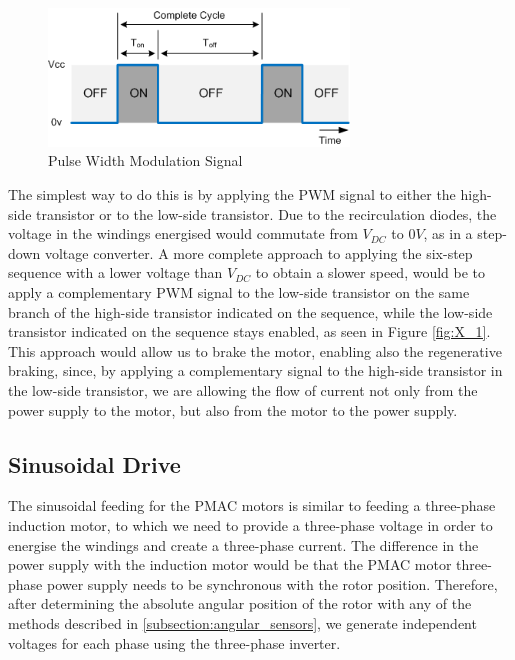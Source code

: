 \begin{figure}[htbp]
\centering
\includegraphics[width=8cm]{Images/dutycycle.png} 
\caption[PWM Signal]{Pulse Width Modulation Signal}
\label{fig:dutycycle}
\end{figure}

The simplest way to do this is by applying the \ac{PWM} signal to either the high-side transistor or to the low-side transistor. Due to the recirculation diodes, the voltage in the windings energised would commutate from $V_{DC}$ to $0V$, as in a step-down voltage converter. A more complete approach to applying the six-step sequence with a lower voltage than $V_{DC}$ to obtain a slower speed, would be to apply a complementary \ac{PWM} signal to the low-side transistor on the same branch of the high-side transistor indicated on the sequence, while the low-side transistor indicated on the sequence stays enabled, as seen in Figure \ref{fig:X_1}. This approach would allow us to brake the motor, enabling also the regenerative braking, since, by applying a complementary signal to the high-side transistor in the low-side transistor, we are allowing the flow of current not only from the power supply to the motor, but also from the motor to the power supply.

\subsection{Sinusoidal Drive}\label{subsection:sinusoidal_drive}

The sinusoidal feeding for the \ac{PMAC} motors is similar to feeding a three-phase induction motor, to which we need to provide a three-phase voltage in order to energise the windings and create a three-phase current. The difference in the power supply with the induction motor would be that the \ac{PMAC} motor three-phase power supply needs to be synchronous with the rotor position. Therefore, after determining the absolute angular position of the rotor with any of the methods described in \ref{subsection:angular_sensors}, we generate independent voltages for each phase using the three-phase inverter.

